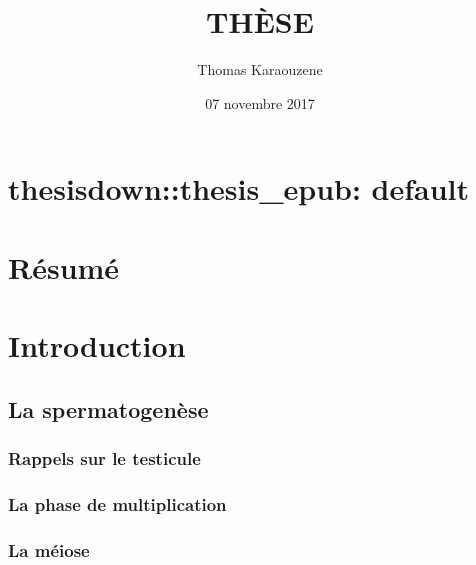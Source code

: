\documentclass[12pt,twoside]{ugathesis}
\title{THÈSE}
\author{Thomas Karaouzene}
\date{07 novembre 2017}
\begin{document}
  \maketitle

\frontmatter %
\pagestyle{empty} %



  \hypersetup{linkcolor=black}
  \setcounter{tocdepth}{3}
  \tableofcontents

  \listoftables

  \listoffigures



\mainmatter %
\pagestyle{fancyplain} %

\chapter{thesisdown::thesis\_epub:
default}\label{thesisdownthesis_epub-default}

\chapter*{Résumé}\label{resume}

\chapter{Introduction}\label{introInf}

\section{La spermatogenèse}\label{la-spermatogenese}

\subsection{Rappels sur le testicule}\label{rappels-sur-le-testicule}

\subsection{La phase de
multiplication}\label{la-phase-de-multiplication}

\subsection{La méiose}\label{meiose}
\end{document}

